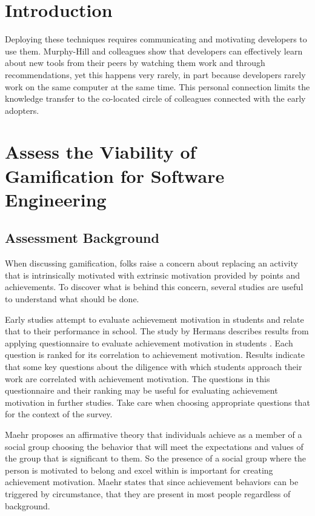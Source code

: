 \documentclass{sig-alternate}
\begin{document}


\section{Introduction}
Deploying these techniques requires communicating and motivating developers to use them.  Murphy-Hill and colleagues  \cite{wbsnipes:Hill2011Peer} show that developers can effectively learn about new tools from their peers by watching them work and through recommendations, yet this happens very rarely, in part because developers rarely work on the same computer at the same time.  This personal connection limits the knowledge transfer to the co-located circle of colleagues connected with the early adopters.  



\section{Assess the Viability of Gamification for Software Engineering}

\subsection{Assessment Background}
When discussing gamification, folks raise a concern about replacing an activity that is intrinsically motivated with extrinsic motivation provided by points and achievements.  To discover what is behind this concern, several studies are useful to understand what should be done. 

Early studies attempt to evaluate achievement motivation in students and relate that to their performance in school.  The study by Hermans describes results from applying questionnaire to evaluate achievement motivation in students \cite{wbsnipes:Hermans1970Questionnaire}.  Each question is ranked for its correlation to achievement motivation. Results indicate that some key questions about the diligence with which students approach their work are correlated with achievement motivation.  The questions in this questionnaire and their ranking may be useful for evaluating achievement motivation in further studies.  Take care when choosing appropriate questions that for the context of the survey.

Maehr proposes an affirmative theory that individuals achieve as a member of a social group choosing the behavior that will meet the expectations and values of the group that is significant to them. \cite{wbsnipes:MaehrCulture}  So the presence of a social group where the person is motivated to belong and excel within is important for creating achievement motivation.  Maehr states that since achievement behaviors can be triggered by circumstance, that they are present in most people regardless of background. 
\end{document}
